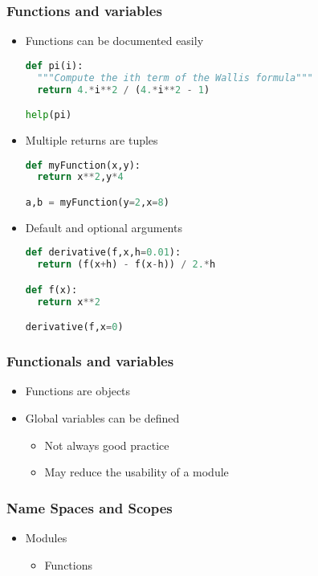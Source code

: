 \documentclass[xcolor=table,10pt,final]{beamer}
\begin{document}
\begin{frame}[fragile]
  \frametitle{Functions and variables}
  \begin{itemize}
    \item Functions can be documented easily\\
      \begin{lstlisting}[language=Python]
def pi(i):
  """Compute the ith term of the Wallis formula"""
  return 4.*i**2 / (4.*i**2 - 1)

help(pi)
      \end{lstlisting}
    \item Multiple returns are tuples\\
      \begin{lstlisting}[language=Python]
def myFunction(x,y):
  return x**2,y*4

a,b = myFunction(y=2,x=8)
      \end{lstlisting}
    \item Default and optional arguments\\
\begin{lstlisting}[language=Python]
def derivative(f,x,h=0.01):
  return (f(x+h) - f(x-h)) / 2.*h

def f(x):
  return x**2

derivative(f,x=0)
\end{lstlisting}
\end{itemize}
\end{frame}

\begin{frame}
  \frametitle{Functionals and variables}
  \begin{itemize}
    \item Functions are objects
    \item Global variables can be defined
      \begin{itemize}
        \item Not always good practice
        \item May reduce the usability of a module
      \end{itemize}
  \end{itemize}
\end{frame}

\begin{frame}
  \frametitle{Name Spaces and Scopes}
  \begin{itemize}
    \item Modules
      \begin{itemize}
        \item Functions
      \end{itemize}
  \end{itemize}
\end{frame}
\end{document}
